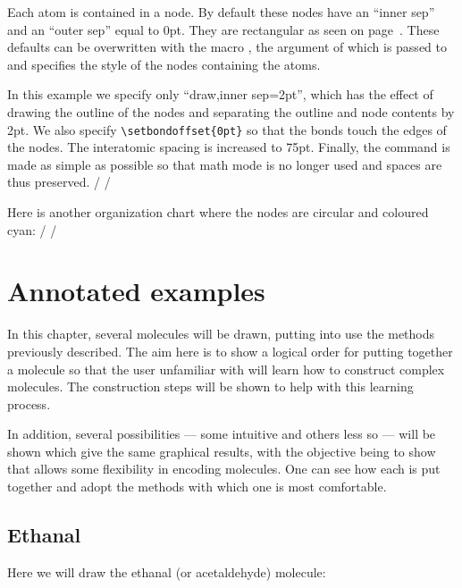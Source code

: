 \documentclass[10pt]{article}
\begin{document}
Each atom is contained in a \TIKZ node. By default these nodes have an ``inner sep'' and an ``outer sep'' equal to 0pt. They are rectangular as seen on page~\pageref{longueur.liaison}. These defaults can be overwritten with the macro \idx{\setnodestyle}, the argument of which is passed to \TIKZ and specifies the style of the nodes containing the atoms.

In this example we specify only ``draw,inner sep=2pt'', which has the effect of drawing the outline of the nodes and separating the outline and node contents by 2pt. We also specify \verb-\setbondoffset{0pt}-\idx{\setbondoffset} so that the bonds touch the edges of the nodes. The interatomic spacing is increased to 75pt. Finally, the command \idx{\printatom} is made as simple as possible so that math mode is no longer used and spaces are thus preserved.
/
\setbondoffset{0pt}
\setatomsep{75pt}
\renewcommand\printatom[1]{#1}
/

Here is another organization chart where the nodes are circular and coloured cyan\idx*{\printatom}:
/
\setbondoffset{0pt}
\setatomsep{80pt}
\renewcommand\printatom[1]{\textsf{#1}}
/

\section{Annotated examples}\label{exemples.commentes}
In this chapter, several molecules will be drawn, putting into use the methods previously described. The aim here is to show a logical order for putting together a molecule so that the user unfamiliar with \CF will learn how to construct complex molecules. The construction steps will be shown to help with this learning process.

In addition, several possibilities --- some intuitive and others less so --- will be shown which give the same graphical results, with the objective being to show that \CF allows some flexibility in encoding molecules. One can see how each is put together and adopt the methods with which one is most comfortable.

\subsection{Ethanal}
Here we will draw the ethanal (or acetaldehyde) molecule: 
\end{document}
